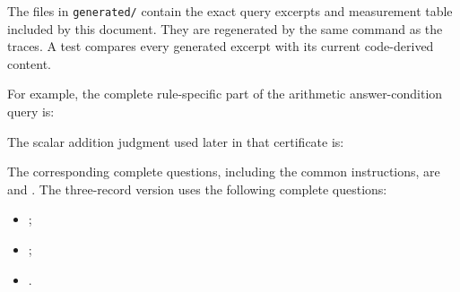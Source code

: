 \documentclass[11pt,twoside]{article}
\theoremstyle{definition}
\begin{document}
The files in \texttt{generated/} contain the exact query excerpts and
measurement table included by this document. They are regenerated by the
same command as the traces. A test compares every generated excerpt with
its current code-derived content.

\enlargethispage{-\baselineskip}
For example, the complete rule-specific part of the arithmetic answer-condition
query is:
\begin{quote}

\end{quote}
The scalar addition judgment used later in that certificate is:
\begin{quote}

\end{quote}
The corresponding complete questions, including the common instructions,
are  and
.
The three-record version uses the following complete questions:
\begin{itemize}[leftmargin=*]
\item {};
\item {};
\item {}.
\end{itemize}
\end{document}
